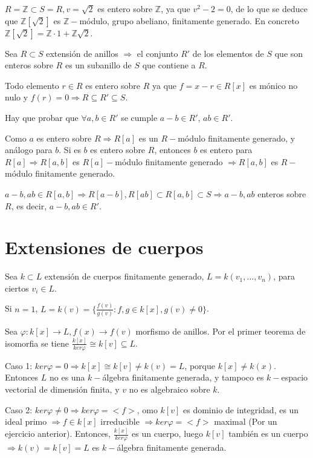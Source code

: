 $R=\mathbb{Z}\subset S=R, v=\sqrt{2}$ es entero sobre $\mathbb{Z}$, ya que $v^2-2=0$, de lo que se deduce que $\mathbb{Z}[\sqrt{2}]$ es $\mathbb{Z}-$módulo, grupo abeliano, finitamente generado. En concreto $\mathbb{Z}[\sqrt{2}]=\mathbb{Z}\cdot 1+\mathbb{Z}\sqrt{2}$.


\begin{Cor}
Sea $R\subset S$ extensión de anillos $\Rightarrow $ el conjunto $R'$ de los elementos de $S$ que son enteros sobre $R$ es un subanillo de $S$ que contiene a $R$.
\end{Cor}

\begin{Dem}
Todo elemento $r\in R$ es entero sobre $R$ ya que $f=x-r\in R[x]$ es mónico no nulo y $f(r)=0 \Rightarrow R\subseteq R'\subseteq S$. 

Hay que probar que $\forall a,b\in R'$ se cumple $a-b\in R'$, $ab\in R'$.

Como $a$ es entero sobre $R\Rightarrow R[a]$ es un $R-$módulo finitamente generado, y análogo para $b$. Si es $b$ es entero sobre $R$, entonces $b$ es entero para $R[a]\Rightarrow R[a,b]$ es $R[a]-$módulo finitamente generado $\Rightarrow R[a,b]$ es $R-$módulo finitamente generado. 

$a-b,ab \in R[a,b] \Rightarrow R[a-b],R[ab]\subset R[a,b]\subset S \Rightarrow a-b,ab$ enteros sobre $R$, es decir, $a-b,ab\in R'$.
\end{Dem}

\section{Extensiones de cuerpos}

Sea $k\subset L$ extensión de cuerpos finitamente generado, $L=k(v_1,\dots,v_n)$, para ciertos $v_i\in L$.

Si $n=1$, $L=k(v)=\{\frac{f(v)}{g(v)}:f,g\in k[x],g(v)\neq 0 \}$.

Sea $\varphi:k[x]\rightarrow L, f(x)\rightarrow f(v)$ morfismo de anillos. Por el primer teorema de isomorfia se tiene $\frac{k[x]}{ker \varphi}\cong k[v]\subseteq L$. 

Caso 1: $ker \varphi = 0 \Rightarrow k[x] \cong k[v]\neq k(v)=L$, porque $k[x]\neq k(x)$. Entonces $L$ no es una $k-$álgebra finitamente generada, y tampoco es $k-$espacio vectorial de dimensión finita, y $v$ no es algebraico sobre $k$.

Caso 2: $ker\varphi \neq 0 \Rightarrow ker \varphi =<f>$,  omo $k[v]$ es dominio de integridad, es un ideal primo $\Rightarrow f\in k[x]$ irreducible $\Rightarrow ker \varphi =<f>$ maximal (Por un ejercicio anterior). Entonces, $\frac{k[x]}{ker\varphi}$ es un cuerpo, luego $k[v]$ también es un cuerpo $\Rightarrow k(v)=k[v]=L$ es $k-$álgebra finitamente generada.

